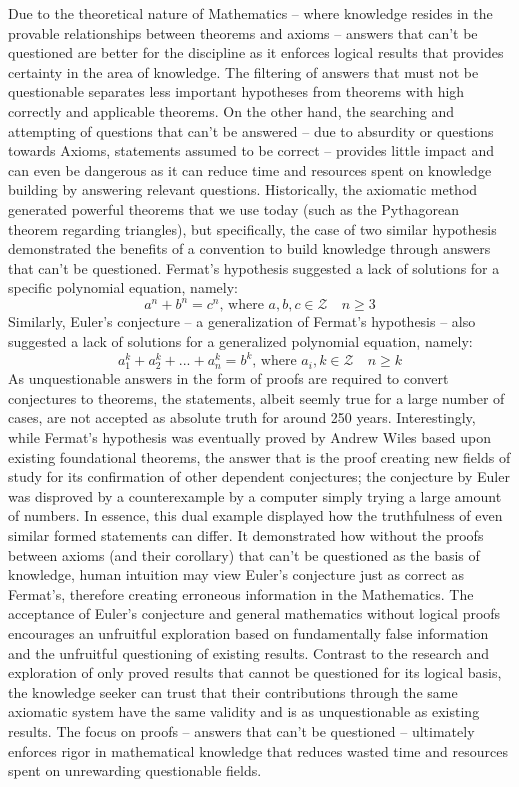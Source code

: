\documentclass[a4paper,12pt]{article}
\begin{document}
Due to the theoretical nature of Mathematics – where knowledge resides in the provable relationships between theorems and axioms – answers that can’t be questioned are better for the discipline as it enforces logical results that provides certainty in the area of knowledge. The filtering of answers that must not be questionable separates less important hypotheses from theorems with high correctly and applicable theorems. On the other hand, the searching and attempting of questions that can’t be answered – due to absurdity or questions towards Axioms, statements assumed to be correct – provides little impact and can even be dangerous as it can reduce time and resources spent on knowledge building by answering relevant questions. Historically, the axiomatic method generated powerful theorems that we use today (such as the Pythagorean theorem regarding triangles), but specifically, the case of two similar hypothesis demonstrated the benefits of a convention to build knowledge through answers that can’t be questioned. Fermat's hypothesis suggested a lack of solutions for a specific polynomial equation, namely:
\[
    a^n + b^n = c^n, \, \text{where} \,\, a, b, c \in \mathcal{Z} \quad n \ge 3
\]
Similarly, Euler’s conjecture – a generalization of Fermat’s hypothesis – also suggested a lack of solutions for a generalized polynomial equation, namely:
\[
    a_1^k+a_2^k + ... + a_n^k = b^k, \, \text{where} \,\, a_i, k \in \mathcal{Z} \quad n \ge k
\]
As unquestionable answers in the form of proofs are required to convert conjectures to theorems, the statements, albeit seemly true for a large number of cases, are not accepted as absolute truth for around 250 years. Interestingly, while Fermat's hypothesis was eventually proved by Andrew Wiles based upon existing foundational theorems, the answer that is the proof creating new fields of study for its confirmation of other dependent conjectures; the conjecture by Euler was disproved by a counterexample by a computer simply trying a large amount of numbers. In essence, this dual example displayed how the truthfulness of even similar formed statements can differ. It demonstrated how without the proofs between axioms (and their corollary) that can’t be questioned as the basis of knowledge, human intuition may view Euler’s conjecture just as correct as Fermat's, therefore creating erroneous information in the Mathematics. The acceptance of Euler’s conjecture and general mathematics without logical proofs encourages an unfruitful exploration based on fundamentally false information and the unfruitful questioning of existing results. Contrast to the research and exploration of only proved results that cannot be questioned for its logical basis, the knowledge seeker can trust that their contributions through the same axiomatic system have the same validity and is as unquestionable as existing results. The focus on proofs – answers that can’t be questioned – ultimately enforces rigor in mathematical knowledge that reduces wasted time and resources spent on unrewarding questionable fields.
\end{document}
